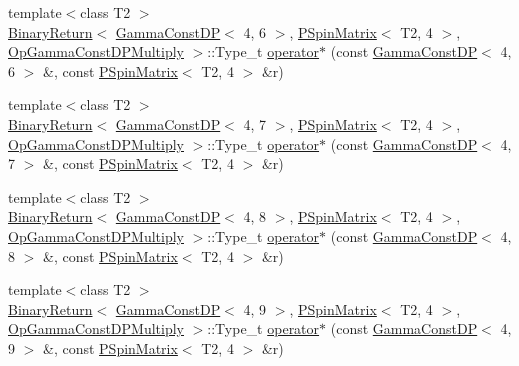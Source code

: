 \begin{DoxyCompactItemize}
\item 
{\footnotesize template$<$class T2 $>$ }\\\mbox{\hyperlink{structENSEM_1_1BinaryReturn}{Binary\+Return}}$<$ \mbox{\hyperlink{classENSEM_1_1GammaConstDP}{Gamma\+Const\+DP}}$<$ 4, 6 $>$, \mbox{\hyperlink{classENSEM_1_1PSpinMatrix}{P\+Spin\+Matrix}}$<$ T2, 4 $>$, \mbox{\hyperlink{structENSEM_1_1OpGammaConstDPMultiply}{Op\+Gamma\+Const\+D\+P\+Multiply}} $>$\+::Type\+\_\+t \mbox{\hyperlink{group__primspinmatrix_ga065100ce0a5fe4278e64d79e1b21c8c7}{operator$\ast$}} (const \mbox{\hyperlink{classENSEM_1_1GammaConstDP}{Gamma\+Const\+DP}}$<$ 4, 6 $>$ \&, const \mbox{\hyperlink{classENSEM_1_1PSpinMatrix}{P\+Spin\+Matrix}}$<$ T2, 4 $>$ \&r)
\item 
{\footnotesize template$<$class T2 $>$ }\\\mbox{\hyperlink{structENSEM_1_1BinaryReturn}{Binary\+Return}}$<$ \mbox{\hyperlink{classENSEM_1_1GammaConstDP}{Gamma\+Const\+DP}}$<$ 4, 7 $>$, \mbox{\hyperlink{classENSEM_1_1PSpinMatrix}{P\+Spin\+Matrix}}$<$ T2, 4 $>$, \mbox{\hyperlink{structENSEM_1_1OpGammaConstDPMultiply}{Op\+Gamma\+Const\+D\+P\+Multiply}} $>$\+::Type\+\_\+t \mbox{\hyperlink{group__primspinmatrix_ga2c4f08577a26616df666f15bc0a836e8}{operator$\ast$}} (const \mbox{\hyperlink{classENSEM_1_1GammaConstDP}{Gamma\+Const\+DP}}$<$ 4, 7 $>$ \&, const \mbox{\hyperlink{classENSEM_1_1PSpinMatrix}{P\+Spin\+Matrix}}$<$ T2, 4 $>$ \&r)
\item 
{\footnotesize template$<$class T2 $>$ }\\\mbox{\hyperlink{structENSEM_1_1BinaryReturn}{Binary\+Return}}$<$ \mbox{\hyperlink{classENSEM_1_1GammaConstDP}{Gamma\+Const\+DP}}$<$ 4, 8 $>$, \mbox{\hyperlink{classENSEM_1_1PSpinMatrix}{P\+Spin\+Matrix}}$<$ T2, 4 $>$, \mbox{\hyperlink{structENSEM_1_1OpGammaConstDPMultiply}{Op\+Gamma\+Const\+D\+P\+Multiply}} $>$\+::Type\+\_\+t \mbox{\hyperlink{group__primspinmatrix_ga15c8807596a50758b2f396f050d763c8}{operator$\ast$}} (const \mbox{\hyperlink{classENSEM_1_1GammaConstDP}{Gamma\+Const\+DP}}$<$ 4, 8 $>$ \&, const \mbox{\hyperlink{classENSEM_1_1PSpinMatrix}{P\+Spin\+Matrix}}$<$ T2, 4 $>$ \&r)
\item 
{\footnotesize template$<$class T2 $>$ }\\\mbox{\hyperlink{structENSEM_1_1BinaryReturn}{Binary\+Return}}$<$ \mbox{\hyperlink{classENSEM_1_1GammaConstDP}{Gamma\+Const\+DP}}$<$ 4, 9 $>$, \mbox{\hyperlink{classENSEM_1_1PSpinMatrix}{P\+Spin\+Matrix}}$<$ T2, 4 $>$, \mbox{\hyperlink{structENSEM_1_1OpGammaConstDPMultiply}{Op\+Gamma\+Const\+D\+P\+Multiply}} $>$\+::Type\+\_\+t \mbox{\hyperlink{group__primspinmatrix_gab9e77cb7fcc24e0d8f81fc43b3274d5d}{operator$\ast$}} (const \mbox{\hyperlink{classENSEM_1_1GammaConstDP}{Gamma\+Const\+DP}}$<$ 4, 9 $>$ \&, const \mbox{\hyperlink{classENSEM_1_1PSpinMatrix}{P\+Spin\+Matrix}}$<$ T2, 4 $>$ \&r)

\end{DoxyCompactItemize}
